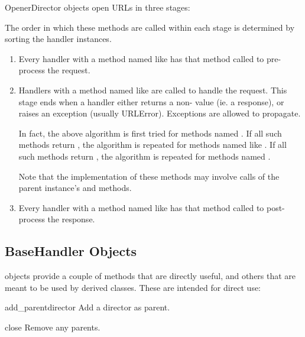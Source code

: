 OpenerDirector objects open URLs in three stages:

The order in which these methods are called within each stage is
determined by sorting the handler instances.

\begin{enumerate}
  \item Every handler with a method named like
     has that method called to
    pre-process the request.

  \item Handlers with a method named like
     are called to handle the request.
    This stage ends when a handler either returns a
    non- value (ie. a response), or raises an exception
    (usually URLError).  Exceptions are allowed to propagate.

    In fact, the above algorithm is first tried for methods named
    .  If all such methods return
    , the algorithm is repeated for methods named like
    .  If all such methods return
    , the algorithm is repeated for methods named
    .

    Note that the implementation of these methods may involve calls of
    the parent  instance's  and
     methods.

  \item Every handler with a method named like
     has that method called to
    post-process the response.

\end{enumerate}

\subsection{BaseHandler Objects \label{base-handler-objects}}

 objects provide a couple of methods that are
directly useful, and others that are meant to be used by derived
classes.  These are intended for direct use:

\begin{methoddesc}[BaseHandler]{add_parent}{director}
Add a director as parent.
\end{methoddesc}

\begin{methoddesc}[BaseHandler]{close}{}
Remove any parents.
\end{methoddesc}

